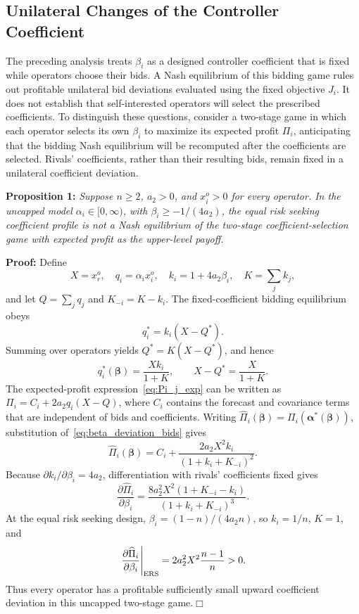 \documentclass[journal]{IEEEtran}
\begin{document}
\subsection{Unilateral Changes of the Controller Coefficient}
\label{sec:beta_deviation}
The preceding analysis treats $\beta_i$ as a designed controller coefficient that is fixed while operators choose their bids. A Nash equilibrium of this bidding game rules out profitable unilateral bid deviations evaluated using the fixed objective $J_i$. It does not establish that self-interested operators will select the prescribed coefficients. To distinguish these questions, consider a two-stage game in which each operator selects its own $\beta_i$ to maximize its expected profit $\Pi_i$, anticipating that the bidding Nash equilibrium will be recomputed after the coefficients are selected. Rivals' coefficients, rather than their resulting bids, remain fixed in a unilateral coefficient deviation.

\noindent\textbf{Proposition 1:} \textit{Suppose $n\geq2$, $a_2>0$, and $x_i^o>0$ for every operator. In the uncapped model $\alpha_i\in[0,\infty)$, with $\beta_i\geq-1/(4a_2)$, the equal risk seeking coefficient profile is not a Nash equilibrium of the two-stage coefficient-selection game with expected profit as the upper-level payoff.}

\noindent\textbf{Proof:} Define
\[
X=x_r^o,\quad q_i=\alpha_i x_i^o,\quad
k_i=1+4a_2\beta_i,\quad K=\sum_j k_j,
\]
and let $Q=\sum_jq_j$ and $K_{-i}=K-k_i$. The fixed-coefficient bidding equilibrium obeys
\[
q_i^*=k_i(X-Q^*).
\]
Summing over operators yields $Q^*=K(X-Q^*)$, and hence
\begin{equation}
q_i^*(\boldsymbol\beta)=\frac{Xk_i}{1+K},\qquad
X-Q^*=\frac{X}{1+K}.
\label{eq:beta_deviation_bids}
\end{equation}
The expected-profit expression~\eqref{eq:Pi_j_exp} can be written as $\Pi_i=C_i+2a_2q_i(X-Q)$, where $C_i$ contains the forecast and covariance terms that are independent of bids and coefficients. Writing $\widehat\Pi_i(\boldsymbol\beta)=\Pi_i(\boldsymbol\alpha^*(\boldsymbol\beta))$, substitution of~\eqref{eq:beta_deviation_bids} gives
\begin{equation}
\widehat\Pi_i(\boldsymbol\beta)
=C_i+\frac{2a_2X^2k_i}{(1+k_i+K_{-i})^2}.
\label{eq:beta_deviation_profit}
\end{equation}
Because $\partial k_i/\partial\beta_i=4a_2$, differentiation with rivals' coefficients fixed gives
\begin{equation}
\frac{\partial\widehat\Pi_i}{\partial\beta_i}
=\frac{8a_2^2X^2(1+K_{-i}-k_i)}{(1+k_i+K_{-i})^3}.
\label{eq:beta_deviation_derivative}
\end{equation}
At the equal risk seeking design, $\beta_i=(1-n)/(4a_2n)$, so $k_i=1/n$, $K=1$, and
\begin{equation}
\left.\frac{\partial\widehat\Pi_i}{\partial\beta_i}\right|_{\rm ERS}
=2a_2^2X^2\frac{n-1}{n}>0.
\label{eq:beta_deviation_ers}
\end{equation}
Thus every operator has a profitable sufficiently small upward coefficient deviation in this uncapped two-stage game.\hfill$\Box$
\end{document}
